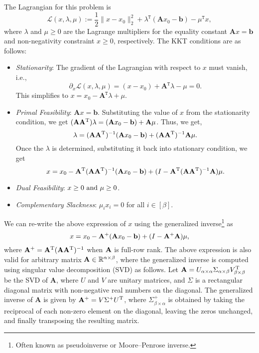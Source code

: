 The Lagrangian for this problem is 
$$\mathcal{L}(x,\lambda,\mu):= \frac{1}{2}\|x-x_0\|^2_2 + \lambda^\texttt{T}(\mathbf{A}x_0-\mathbf{b}) - \mu^\texttt{T}x,$$
where $\lambda$ and $\mu\geq 0$ are the Lagrange multipliers for the equality constant $\mathbf{A}x=\mathbf{b}$ and non-negativity constraint $x\geq 0$, respectively. The KKT conditions are as follows:
\begin{itemize}
    \item \textit{Stationarity}:  The gradient of the Lagrangian with respect to 
$x$ must vanish, i.e.,
$$\partial_x \mathcal{L}(x,\lambda,\mu) = (x-x_0) + \mathbf{A}^\texttt{T}\lambda-\mu = 0.$$
This simplifies to $x = x_0-\mathbf{A}^\texttt{T}\lambda+\mu.$
\item \textit{Primal Feasibility}: $\mathbf{A}x=\mathbf{b}$. Substituting the value of $x$ from the stationarity condition, we get $(\mathbf{A}\mathbf{A}^{\text{T}})\lambda = (\mathbf{A} x_0-\mathbf{b})+\mathbf{A}\mu$.  Thus, we get, $$\lambda = (\mathbf{A}\mathbf{A}^{\text{T}})^{-1}(\mathbf{A} x_0-\mathbf{b})+(\mathbf{A}\mathbf{A}^{\text{T}})^{-1}\mathbf{A}\mu.$$
Once the $\lambda$ is determined, substituting it back into stationary condition, we get $$x = x_0 - \mathbf{A}^{\text{T}}(\mathbf{A}\mathbf{A}^{\text{T}})^{-1}(\mathbf{A} x_0-\mathbf{b})+(I-\mathbf{A}^{\text{T}}(\mathbf{A}\mathbf{A}^{\text{T}})^{-1}\mathbf{A})\mu.$$
\item \textit{Dual Feasibility}: $x\geq 0 \text{ and } \mu \geq 0$.
\item \textit{Complementary Slackness}: $\mu_i x_i= 0$ for all $i \in [\beta].$
\end{itemize}
We can re-write the above expression of $x$ using the generalized inverse\footnote{Often known as pseudoinverse or Moore–Penrose inverse.}\cite{ben2006generalized} as $$x = x_0 - \mathbf{A}^{+}(\mathbf{A} x_0-\mathbf{b})+(I-\mathbf{A}^{+}\mathbf{A})\mu,$$
where $\mathbf{A}^+ = \mathbf{A}^{\text{T}}(\mathbf{A}\mathbf{A}^{\text{T}})^{-1}$ when $\mathbf{A}$ is full-row rank. The above expression is also valid for arbitrary matrix $\mathbf{A} \in \mathbb{R}^{\alpha\times\beta}$, where the generalized inverse is computed using singular value decomposition (SVD) as follows. Let \(\mathbf{A} = U_{\alpha \times \alpha} \Sigma_{\alpha \times \beta} V^{\text{T}}_{\beta \times \beta}\) be the SVD of \(\mathbf{A}\), where \(U\) and \(V\) are unitary matrices, and \(\Sigma\) is a rectangular diagonal matrix with non-negative real numbers on the diagonal. The generalized inverse of \(\mathbf{A}\) is given by \(\mathbf{A}^+ = V \Sigma^+ U^{\text{T}}\), where \(\Sigma^+_{\beta \times \alpha}\) is obtained by taking the reciprocal of each non-zero element on the diagonal, leaving the zeros unchanged, and finally transposing the resulting matrix.

